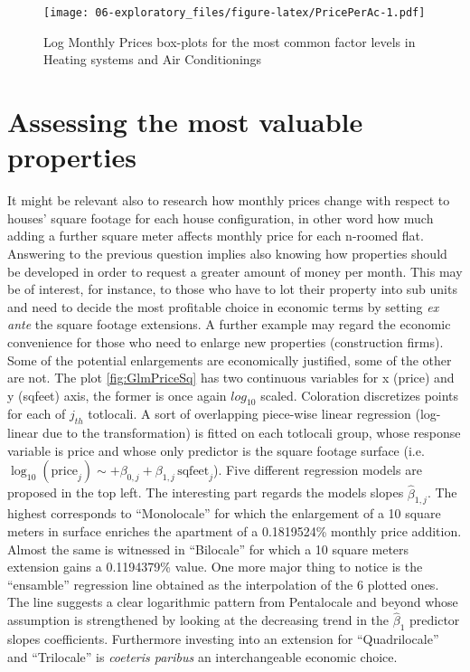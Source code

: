 \documentclass[
  12pt,
  a4paper,
  oneside]{book}
\theoremstyle{definition}
\theoremstyle{definition}
\theoremstyle{definition}
\theoremstyle{remark}
\begin{document}
\begin{figure}
\centering
\texttt{[image: 06-exploratory\_files/figure-latex/PricePerAc-1.pdf]}
\caption{\label{fig:PricePerAc}Log Monthly Prices box-plots for the most common factor levels in Heating systems and Air Conditionings}
\end{figure}

\hypertarget{mvp}{%
\section{Assessing the most valuable properties}\label{mvp}}

It might be relevant also to research how monthly prices change with respect to houses' square footage for each house configuration, in other word how much adding a further square meter affects monthly price for each n-roomed flat.
Answering to the previous question implies also knowing how properties should be developed in order to request a greater amount of money per month. This may be of interest, for instance, to those who have to lot their property into sub units and need to decide the most profitable choice in economic terms by setting \emph{ex ante} the square footage extensions.
A further example may regard the economic convenience for those who need to enlarge new properties (construction firms). Some of the potential enlargements are economically justified, some of the other are not.
The plot \ref{fig:GlmPriceSq} has two continuous variables for x (price) and y (sqfeet) axis, the former is once again \(log_{10}\) scaled. Coloration discretizes points for each of \(j_{th}\) totlocali. A sort of overlapping piece-wise linear regression (log-linear due to the transformation) is fitted on each totlocali group, whose response variable is price and whose only predictor is the square footage surface (i.e.~\(\log_{10}(\text{price}_j) \sim +\beta_{0,j}+\beta_{1,j}\, \text{sqfeet}_j\)). Five different regression models are proposed in the top left. The interesting part regards the models slopes \(\hat\beta_{1,j}\). The highest corresponds to ``Monolocale'' for which the enlargement of a 10 square meters in surface enriches the apartment of a 0.1819524\% monthly price addition. Almost the same is witnessed in ``Bilocale'' for which a 10 square meters extension gains a 0.1194379\% value. One more major thing to notice is the ``ensamble'' regression line obtained as the interpolation of the 6 plotted ones. The line suggests a clear logarithmic pattern from Pentalocale and beyond whose assumption is strengthened by looking at the decreasing trend in the \(\hat\beta_1\) predictor slopes coefficients. Furthermore investing into an extension for ``Quadrilocale'' and ``Trilocale'' is \emph{coeteris paribus} an interchangeable economic choice.
\end{document}
